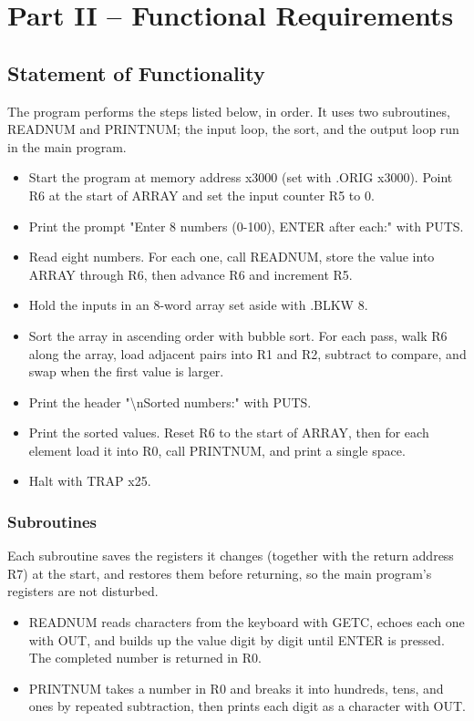 \documentclass[11pt]{article}
\begin{document}
\section*{Part II -- Functional Requirements}

\subsection*{Statement of Functionality}

The program performs the steps listed below, in order. It uses two subroutines, READNUM and PRINTNUM; the input loop, the sort, and the output loop run in the main program.


\begin{itemize}
  \item Start the program at memory address x3000 (set with .ORIG x3000). Point R6 at the start of ARRAY and set the input counter R5 to 0.
  \item Print the prompt "Enter 8 numbers (0-100), ENTER after each:" with PUTS.
  \item Read eight numbers. For each one, call READNUM, store the value into ARRAY through R6, then advance R6 and increment R5.
  \item Hold the inputs in an 8-word array set aside with .BLKW 8.
  \item Sort the array in ascending order with bubble sort. For each pass, walk R6 along the array, load adjacent pairs into R1 and R2, subtract to compare, and swap when the first value is larger.
  \item Print the header "\textbackslash{}nSorted numbers:" with PUTS.
  \item Print the sorted values. Reset R6 to the start of ARRAY, then for each element load it into R0, call PRINTNUM, and print a single space.
  \item Halt with TRAP x25.
\end{itemize}
\subsubsection*{Subroutines}

Each subroutine saves the registers it changes (together with the return address R7) at the start, and restores them before returning, so the main program's registers are not disturbed.


\begin{itemize}
  \item READNUM reads characters from the keyboard with GETC, echoes each one with OUT, and builds up the value digit by digit until ENTER is pressed. The completed number is returned in R0.
  \item PRINTNUM takes a number in R0 and breaks it into hundreds, tens, and ones by repeated subtraction, then prints each digit as a character with OUT.
\end{itemize}
\end{document}
